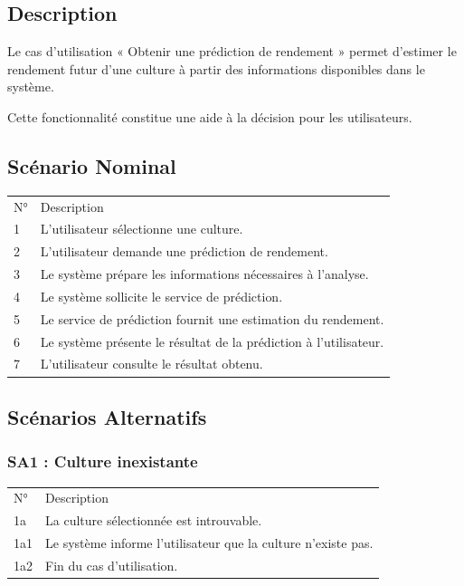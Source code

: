 \documentclass[
]{book}
\begin{document}
\hypertarget{description-2}{%
\subsection{Description}\label{description-2}}

Le cas d'utilisation « Obtenir une prédiction de rendement » permet
d'estimer le rendement futur d'une culture à partir des informations
disponibles dans le système.

Cette fonctionnalité constitue une aide à la décision pour les
utilisateurs.

\hypertarget{scuxe9nario-nominal-3}{%
\subsection{Scénario Nominal}\label{scuxe9nario-nominal-3}}

\begin{longtable}[]{@{}ll@{}}
\toprule
\endhead
N° & Description \\
1 & L'utilisateur sélectionne une culture. \\
2 & L'utilisateur demande une prédiction de rendement. \\
3 & Le système prépare les informations nécessaires à l'analyse. \\
4 & Le système sollicite le service de prédiction. \\
5 & Le service de prédiction fournit une estimation du rendement. \\
6 & Le système présente le résultat de la prédiction à l'utilisateur. \\
7 & L'utilisateur consulte le résultat obtenu. \\
\bottomrule
\end{longtable}

\hypertarget{scuxe9narios-alternatifs-3}{%
\subsection{Scénarios Alternatifs}\label{scuxe9narios-alternatifs-3}}

\hypertarget{sa1-culture-inexistante-1}{%
\subsubsection{SA1 : Culture
inexistante}\label{sa1-culture-inexistante-1}}

\begin{longtable}[]{@{}ll@{}}
\toprule
\endhead
N° & Description \\
1a & La culture sélectionnée est introuvable. \\
1a1 & Le système informe l'utilisateur que la culture n'existe pas. \\
1a2 & Fin du cas d'utilisation. \\
\bottomrule
\end{longtable}
\end{document}
